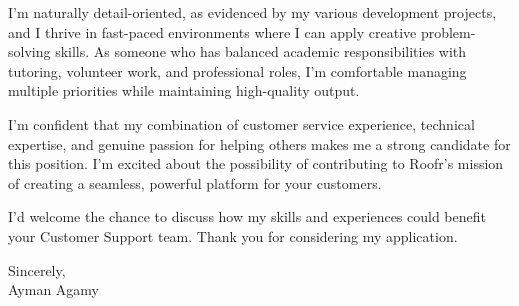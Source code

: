 \documentclass{article}
\begin{document}
    \vspace{1em}

    \noindent
    I'm naturally detail-oriented, as evidenced by my various development projects, and I thrive in fast-paced environments where I can apply creative problem-solving skills. As someone who has balanced academic responsibilities with tutoring, volunteer work, and professional roles, I'm comfortable managing multiple priorities while maintaining high-quality output.

    \vspace{1em}

    \noindent
    I'm confident that my combination of customer service experience, technical expertise, and genuine passion for helping others makes me a strong candidate for this position. I'm excited about the possibility of contributing to Roofr's mission of creating a seamless, powerful platform for your customers.


    \vspace{1em}

    \noindent
    I'd welcome the chance to discuss how my skills and experiences could benefit your Customer Support team. Thank you for considering my application.


    \noindent
    Sincerely, \\
    Ayman Agamy
\end{document}
